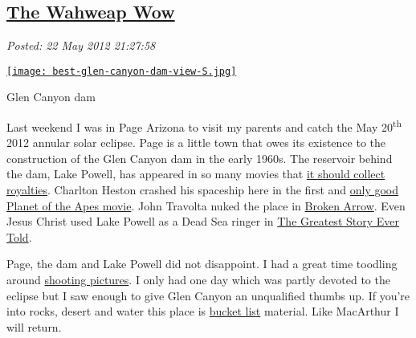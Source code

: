%

\subsection*{\href{https://bakerjd99.wordpress.com/2012/05/22/the-wahweap-wow/}{The Wahweap Wow}}


\noindent\emph{Posted: 22 May 2012 21:27:58}
\vspace{6pt}



\captionsetup[floatingfigure]{labelformat=empty}
\begin{floatingfigure}[r]{0.32\textwidth}
\centering
\href{http://conceptcontrol.smugmug.com/Trips/USA-and-Canada/Arizona-Toodling-1/7475075\_MrjqMc}{\texttt{[image: best-glen-canyon-dam-view-S.jpg]}}
\caption{Glen Canyon dam}
\label{fig:2818X0}
\end{floatingfigure}Last weekend I was in Page Arizona to visit my parents and catch the May
20\textsuperscript{th} 2012 annular solar eclipse. Page is a little town
that owes its existence to the construction of the Glen Canyon dam in
the early 1960s. The reservoir behind the dam, Lake Powell, has
appeared in so many movies that
\href{http://www.lakepowellrealty.net/lake-powell-movies/}{it should
collect royalties}. Charlton Heston crashed his spaceship here in the first
and
\href{http://en.wikipedia.org/wiki/Planet\_of\_the\_Apes\_(1968\_film)}{only
good Planet of the Apes movie}. John Travolta
nuked the place in \href{http://www.imdb.com/title/tt0115759/}{Broken
Arrow}. Even Jesus Christ used Lake Powell as a Dead Sea ringer in
\href{http://www.imdb.com/title/tt0059245/}{The Greatest Story Ever
Told}.

Page, the dam and Lake Powell did not disappoint. I had a great time
toodling around \href{http://conceptcontrol.smugmug.com/Trips/USA-and-Canada/Arizona-Toodling-1/7475075_MrjqMc}{shooting pictures}. I only 
had one day which was partly
devoted to the eclipse but I saw enough to give Glen Canyon an
unqualified thumbs up. If you're into rocks, desert and water this place
is \href{http://bucketlist.org/}{bucket list} material. Like MacArthur I
will return.



